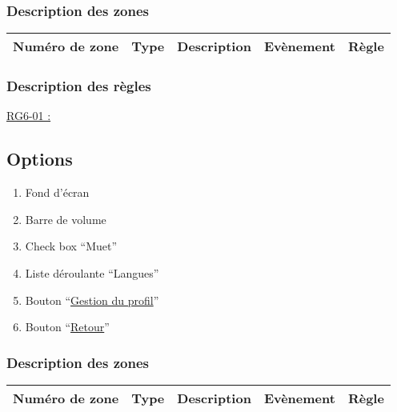 \documentclass{report}
\begin{document}
		\subsubsection{Description des zones}
		
			\begin{tabular}{|c|c|c|c|c|} \hline
				Numéro de zone & Type  & Description & Evènement &	Règle \\\hline
			\end{tabular}
			
		\subsubsection{Description des règles}

			\underline{RG6-01 :}
				\begin{quote}
				
				\end{quote}	
	
\newpage

	\subsection{Options}
	
		\hypertarget{Options}{}
		\label{Options}
	
		
		
		\begin{enumerate}
		  \item Fond d'écran
		  \item Barre de volume
		  \item Check box ``Muet''
		  \item Liste déroulante ``Langues''
		  \item Bouton ``\hyperlink{Page d'accueil}{Gestion du profil}''
		  \item Bouton ``\hyperlink{Page d'accueil}{Retour}''
		\end{enumerate}

		\subsubsection{Description des zones}
		
			\begin{tabular}{|c|c|c|c|c|} \hline
				Numéro de zone & Type  & Description & Evènement &	Règle \\\hline
			\end{tabular}
			
\end{document}
